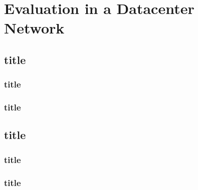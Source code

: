 \chapter{Evaluation in a Datacenter Network}\label{ch4}

\section{title}

\subsection{title}

\subsection{title}

\section{title}

\subsection{title}

\subsection{title}